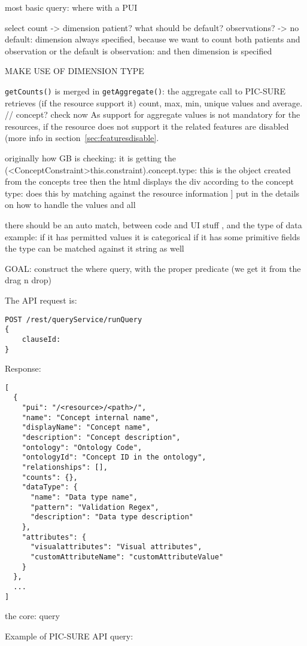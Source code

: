most basic query: where with a PUI

select count 
-> dimension patient? what should be default? observations? 
-> no default: dimension always specified, because we want to count both patients and observation 
or the default is observation: and then dimension is specified 

MAKE USE OF DIMENSION TYPE

\verb|getCounts()| is merged in \verb|getAggregate()|: the aggregate call to PIC-SURE retrieves (if the resource support it) count, max, min, unique values and average. // concept? check now
As support for aggregate values is not mandatory for the resources, if the resource does not support it the related features are disabled (more info in section~\ref{sec:featuresdisable}.

originally how GB is checking: it is getting the (<ConceptConstraint>this.constraint).concept.type: this is the object created from the concepts tree
then the html displays the div according to the concept type: does this by matching against the resource information ]
put in the details on how to handle the values and all

there should be an auto match, between code and UI stuff , and the type of data
example: if it has permitted values it is categorical
if it has some primitive fields the type can be matched against it
string as well

GOAL: construct the where query, with the proper predicate (we get it from the drag n drop)


The API request is:
\begin{verbatim}
POST /rest/queryService/runQuery
{
    clauseId: 
}
\end{verbatim}

Response:
\begin{verbatim}
[
  {
    "pui": "/<resource>/<path>/",
    "name": "Concept internal name",
    "displayName": "Concept name",
    "description": "Concept description",
    "ontology": "Ontology Code",
    "ontologyId": "Concept ID in the ontology",
    "relationships": [],
    "counts": {},
    "dataType": {
      "name": "Data type name",
      "pattern": "Validation Regex",
      "description": "Data type description"
    },
    "attributes": {
      "visualattributes": "Visual attributes",
      "customAttributeName": "customAttributeValue"
    }
  },
  ...
]
\end{verbatim}


the core: query

Example of PIC-SURE API query:

